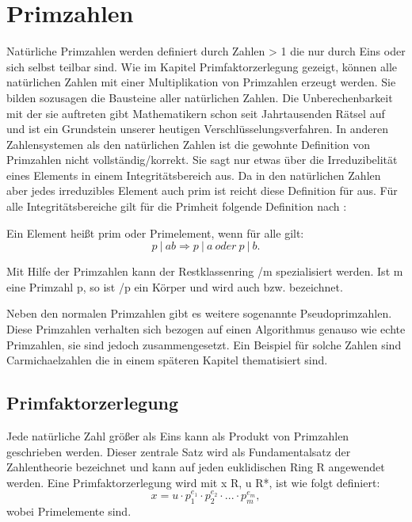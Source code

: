 \section{Primzahlen}
	Natürliche Primzahlen werden definiert durch Zahlen > 1 die nur durch Eins oder sich selbst teilbar sind. Wie im Kapitel Primfaktorzerlegung gezeigt, können alle natürlichen Zahlen mit einer Multiplikation von Primzahlen erzeugt werden. Sie bilden sozusagen die Bausteine aller natürlichen Zahlen. Die Unberechenbarkeit mit der sie auftreten gibt Mathematikern schon seit Jahrtausenden Rätsel auf und ist ein Grundstein unserer heutigen Verschlüsselungsverfahren.
	In anderen Zahlensystemen als den natürlichen Zahlen ist die gewohnte Definition von Primzahlen nicht vollständig/korrekt. Sie sagt nur etwas über die Irreduzibelität eines Elements in einem Integritätsbereich aus. Da in den natürlichen Zahlen aber jedes irreduzibles Element auch prim ist reicht diese Definition für  aus.
	Für alle Integritätsbereiche gilt für die Primheit folgende Definition nach \cite{Algorithmische:Zahlentheorie}:
	
	Ein Element  heißt prim oder Primelement, wenn für alle  gilt:	
	\begin{displaymath}
		p~|~ab \Longrightarrow p~|~a~oder~p~|~b.
	\end{displaymath}
		
	Mit Hilfe der Primzahlen kann der Restklassenring /m spezialisiert werden. Ist m eine Primzahl p, so ist /p ein Körper und wird auch  bzw.  bezeichnet.
	
	Neben den normalen Primzahlen gibt es weitere sogenannte Pseudoprimzahlen. Diese Primzahlen verhalten sich bezogen auf einen Algorithmus genauso wie echte Primzahlen, sie sind jedoch zusammengesetzt. Ein Beispiel für solche Zahlen sind Carmichaelzahlen die in einem späteren Kapitel thematisiert sind.

	\subsection{Primfaktorzerlegung}
	Jede natürliche Zahl größer als Eins kann als Produkt von Primzahlen geschrieben werden. Dieser zentrale Satz wird als Fundamentalsatz der Zahlentheorie bezeichnet und kann auf jeden euklidischen Ring R angewendet werden. Eine Primfaktorzerlegung wird mit x \myin R, u \myin R*,  \myin {} ist wie folgt definiert:	
	\begin{displaymath}
		x = u \cdot p^{e_1}_1 \cdot p^{e_2}_2 \cdot . . . \cdot p^{e_m}_m,
	\end{displaymath}
	wobei   Primelemente sind.
	
